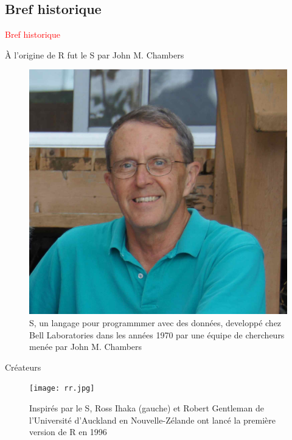 \documentclass[11pt]{beamer}\usepackage[]{graphicx}\usepackage[]{color}
\begin{document}
\subsection{Bref historique}

\begin{frame}
 \begin{center}
  \Huge{\textcolor{red}{Bref historique}}
 \end{center}
\end{frame}


\begin{frame}{\`{A} l'origine de R fut le S par John M. Chambers}
\begin{center}
\begin{figure}
\includegraphics[scale=0.10]{john.jpg}
\caption{S, un langage pour programmmer avec des donn\'{e}es, developp\'{e} chez Bell Laboratories dans les ann\'{e}es 1970 par une \'{e}quipe de chercheurs men\'{e}e par John M. Chambers}
\end{figure}
\end{center}
\end{frame}


\begin{frame}{Cr\'{e}ateurs}
\begin{center}
\begin{figure}
\texttt{[image: rr.jpg]}
\caption{Inspir\'{e}s par le S, Ross Ihaka (gauche) et Robert Gentleman de l'Universit\'{e} d'Auckland en Nouvelle-Z\'{e}lande ont lanc\'{e} la premi\`{e}re version de R en 1996}
\end{figure}
\end{center}
\end{frame}
\end{document}
